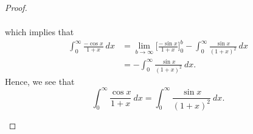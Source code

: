 \documentclass[a4paper]{article}
\begin{document}
\begin{proof}
\begin{enumerate}
\begin{align*}
        \end{align*}
        which implies that 
        \begin{align*}
            \int_{ 0 }^{ \infty  } \frac{ -\cos x  }{  1 + x  }   \ dx &= \lim_{ b \to \infty   }  \Big[ \frac{ - \sin x  }{  1 + x  } \Big]_{0}^{b} - \int_{ 0 }^{ \infty  }  \frac{ \sin x  }{  (1+x)^{2} }  \ dx \\
                                                                       &= - \int_{ 0 }^{ \infty  } \frac{ \sin x  }{  (1+x)^{2} }   \ dx.
    \end{align*}
    Hence, we see that 
    \[  \int_{ 0 }^{ \infty  }  \frac{ \cos x  }{  1 + x }  \ dx = \int_{ 0 }^{ \infty  }  \frac{ \sin x  }{  (1+x)^{2} }  \ dx. \]
        

        
\end{enumerate}
    \end{proof}
\end{document}
